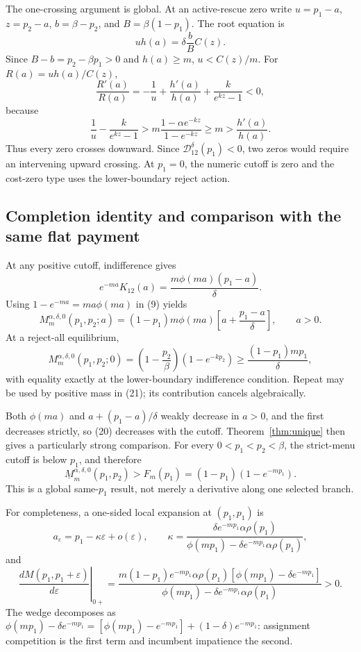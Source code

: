 \documentclass[mnsc,blindrev]{informs3}
\newcommand{\ph}{\phi}
\begin{document}
The one-crossing argument is global.  At an active-rescue zero write
$u=p_1-a$, $z=p_2-a$, $b=\beta-p_2$, and $B=\beta(1-p_1)$.
The root equation is
\[
 uh(a)=\delta\frac bB C(z).
\]
Since $B-b=p_2-\beta p_1>0$ and $h(a)\ge m$, $u<C(z)/m$.  For
$R(a)=u h(a)/C(z)$,
\[
 \frac{R'(a)}{R(a)}
 =-\frac1u+\frac{h'(a)}{h(a)}+\frac{k}{e^{kz}-1}<0,          \tag{19}
\]
because
\[
 \frac1u-\frac{k}{e^{kz}-1}
 >m\frac{1-\alpha e^{-kz}}{1-e^{-kz}}
 \ge m>\frac{h'(a)}{h(a)}.
\]
Thus every zero crosses downward.  Since
$\mathcal D_{12}^{\delta}(p_1)<0$, two zeros would require an intervening upward
crossing.  At $p_1=0$, the numeric cutoff is zero and the cost-zero type uses
the lower-boundary reject action.

\subsection{Completion identity and comparison with the same flat payment}

At any positive cutoff, indifference gives
\[
 e^{-ma}K_{12}(a)=\frac{m\ph(ma)(p_1-a)}\delta.
\]
Using $1-e^{-ma}=ma\ph(ma)$ in (9) yields
\[
 M_m^{\alpha,\delta,0}(p_1,p_2;a)
 =(1-p_1)m\ph(ma)\left[a+\frac{p_1-a}\delta\right],
 \qquad a>0.                                                \tag{20}
\]
At a reject-all equilibrium,
\[
 M_m^{\alpha,\delta,0}(p_1,p_2;0)=
 \left(1-\frac {p_2}\beta\right)(1-e^{-kp_2})
 \ge\frac{(1-p_1)mp_1}{\delta},                           \tag{21}
\]
with equality exactly at the lower-boundary indifference condition.  Repeat
may be used by positive mass in (21); its contribution cancels algebraically.

Both $\ph(ma)$ and $a+(p_1-a)/\delta$ weakly decrease in $a>0$, and the
first decreases strictly, so (20) decreases with the cutoff.
Theorem~\ref{thm:unique} then gives a particularly strong comparison.  For
every $0<p_1<p_2<\beta$, the strict-menu cutoff is below $p_1$, and therefore
\[
 \underline M_m^{\alpha,\delta,0}(p_1,p_2)>F_m(p_1)
 =(1-p_1)(1-e^{-mp_1}).                                    \tag{22}
\]
This is a global same-$p_1$ result, not merely a derivative along one selected
branch.

For completeness, a one-sided local expansion at $(p_1,p_1)$ is
\[
 a_\varepsilon=p_1-\kappa\varepsilon+o(\varepsilon),
 \qquad
 \kappa=
 \frac{\delta e^{-mp_1}\alpha\rho(p_1)}
 {\ph(mp_1)-\delta e^{-mp_1}\alpha\rho(p_1)},            \tag{23}
\]
and
\[
 \left.\frac{dM(p_1,p_1+\varepsilon)}{d\varepsilon}\right|_{0+}
 =\frac{m(1-p_1)e^{-mp_1}\alpha\rho(p_1)
 [\ph(mp_1)-\delta e^{-mp_1}]}
 {\ph(mp_1)-\delta e^{-mp_1}\alpha\rho(p_1)}>0.          \tag{24}
\]
The wedge decomposes as
$\ph(mp_1)-\delta e^{-mp_1}=[\ph(mp_1)-e^{-mp_1}]
+(1-\delta)e^{-mp_1}$:
assignment competition is the first term and incumbent impatience the second.
\end{document}
